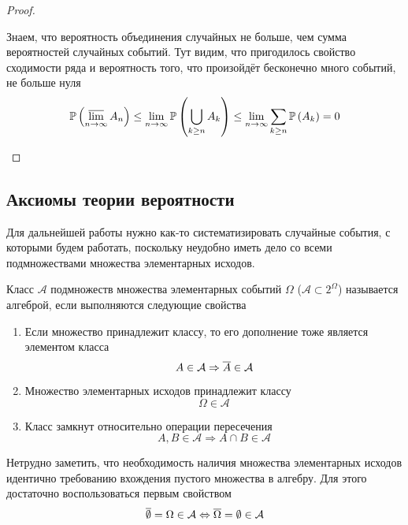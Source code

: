 \begin{proof}
\begin{enumerate}[label=\alph*]
        Знаем, что вероятность объединения случайных не больше,
        чем сумма вероятностей случайных событий.
        Тут видим, что пригодилось свойство сходимости ряда и вероятность того,
        что произойдёт бесконечно много событий, не больше нуля
        $$\mathbb{P}\left( \varlimsup\limits_{n\to\infty} A_n \right)
            \le\lim\limits_{n\to\infty}\mathbb{P}\left( \bigcup_{k\ge n} A_k \right)
            \le\lim\limits_{n\to\infty}\sum_{k\ge n}\mathbb{P}\left( A_k \right)=0$$
    \end{enumerate}
\end{proof}
\subsection{Аксиомы теории вероятности}
Для дальнейшей работы нужно как-то систематизировать случайные события,
с которыми будем работать, поскольку неудобно иметь дело со всеми подмножествами
множества элементарных исходов.
\begin{definition}[Алгебра]
    Класс $\mathcal{A}$ подмножеств множества элементарных событий $\Omega$
    ($\mathcal{A}\subset2^\Omega$)
    называется алгеброй, если выполняются следующие свойства
    \begin{enumerate}
        \item Если множество принадлежит классу,
            то его дополнение тоже является элементом класса
            $$A\in\mathcal{A}\Rightarrow\overline{A}\in\mathcal{A}$$
        \item Множество элементарных исходов принадлежит классу 
            $$\Omega\in\mathcal{A}$$
        \item Класс замкнут относительно операции пересечения
            $$A,B\in\mathcal{A}\Rightarrow A\cap B\in\mathcal{A}$$
    \end{enumerate}
\end{definition}

\begin{remark}Нетрудно заметить,
    что необходимость наличия множества элементарных исходов идентично
    требованию вхождения пустого множества в алгебру. Для этого достаточно
    воспользоваться первым свойством
    $$\overline{\emptyset}=\Omega\in\mathcal{A}
            \Leftrightarrow\overline{\Omega}=\emptyset\in\mathcal{A}$$
\end{remark}

